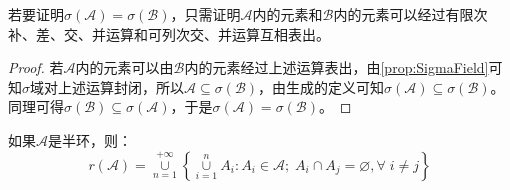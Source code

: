 \begin{theorem}\label{theo:GeneratedSigmaFieldEqual}
	若要证明$\sigma(\mathscr{A})=\sigma(\mathscr{B})$，只需证明$\mathscr{A}$内的元素和$\mathscr{B}$内的元素可以经过有限次补、差、交、并运算和可列次交、并运算互相表出。
\end{theorem}
\begin{proof}
	若$\mathscr{A}$内的元素可以由$\mathscr{B}$内的元素经过上述运算表出，由\cref{prop:SigmaField}可知$\sigma$域对上述运算封闭，所以$\mathscr{A}\subseteq\sigma(\mathscr{B})$，由生成的定义可知$\sigma(\mathscr{A})\subseteq\sigma(\mathscr{B})$。同理可得$\sigma(\mathscr{B})\subseteq\sigma(\mathscr{A})$，于是$\sigma(\mathscr{A})=\sigma(\mathscr{B})$。
\end{proof}
\begin{theorem}\label{theo:RingGeneratedBySemiring}
	如果$\mathscr{A}$是半环，则：
	\begin{equation*}
		r(\mathscr{A})=
		\underset{n=1}{\overset{+\infty}{\cup}}
		\left\{\underset{i=1}{\overset{n}{\cup}}A_i:A_i\in\mathscr{A};\;A_i\cap A_j=\varnothing,\forall\;i\ne j\right\}
	\end{equation*}
\end{theorem}

